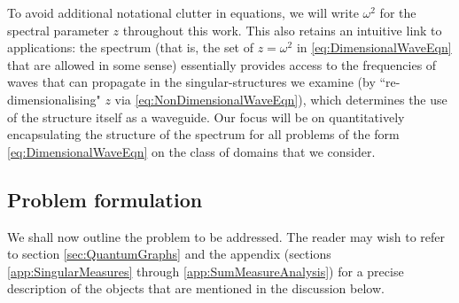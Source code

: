 To avoid additional notational clutter in equations, we will write $\omega^2$ for the spectral parameter $z$ throughout this work.
This also retains an intuitive link to applications: the spectrum (that is, the set of $z=\omega^2$ in \eqref{eq:DimensionalWaveEqn} that are allowed in some sense) essentially provides access to the frequencies of waves that can propagate in the singular-structures we examine (by ``re-dimensionalising" $z$ via \eqref{eq:NonDimensionalWaveEqn}), which determines the use of the structure itself as a waveguide.
Our focus will be on quantitatively encapsulating the structure of the spectrum for all problems of the form \eqref{eq:DimensionalWaveEqn} on the class of domains that we consider.

\subsection{Problem formulation} \label{ssec:OurSystem}
We shall now outline the problem to be addressed.
The reader may wish to refer to section \ref{sec:QuantumGraphs} and the appendix (sections \ref{app:SingularMeasures} through \ref{app:SumMeasureAnalysis}) for a precise description of the objects that are mentioned in the discussion below. 

